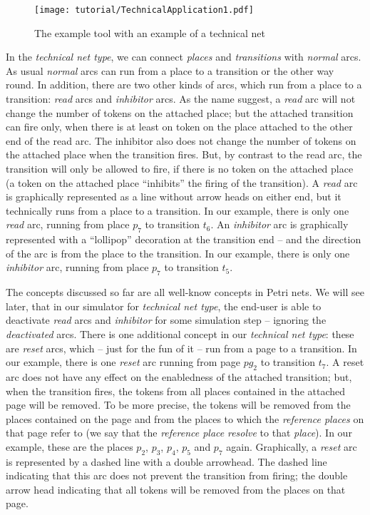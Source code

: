\begin{sidewaysfigure}[p!!]
  \centerline{\texttt{[image: tutorial/TechnicalApplication1.pdf]}}
  \caption{The example tool with an example of a technical net}
  \label{fig:tutorial:app1}
\end{sidewaysfigure}

In the \emph{technical net type}, we can connect \emph{places} and
\emph{transitions} with \emph{normal} arcs. As usual \emph{normal} arcs can run
from a place to a transition or the other way round. In addition, there are two
other kinds of arcs, which run from a place to a transition: \emph{read} arcs
and \emph{inhibitor} arcs. As the name suggest, a \emph{read} arc will not
change the number of tokens on the attached place; but the attached
transition can fire only, when there is at least on token on the place attached
to the other end of the read arc.
The inhibitor also does not change the number of tokens on the attached place when the transition fires. But, by contrast to the read
arc, the transition will only be allowed to fire, if there is no token on the
attached place (a token on the attached place ``inhibits'' the firing of the
transition). A \emph{read} arc is graphically represented as a line without
arrow heads on either end, but it technically runs from a place to a
transition. In our example, there is only one \emph{read} arc, running from
place $p_7$ to transition $t_6$.
An \emph{inhibitor} arc is graphically represented with a ``lollipop''
decoration at the transition end --  and the direction of the arc is from
the place to the transition. In our example, there is only one \emph{inhibitor}
arc, running from place $p_7$ to transition $t_5$.

The concepts discussed so far are all well-know concepts in Petri nets. We
will see later, that in our simulator for \emph{technical net type}, the
end-user is able to deactivate \emph{read} arcs and \emph{inhibitor} for some
simulation step -- ignoring the \emph{deactivated} arcs. There is one additional
concept in our \emph{technical net type}: these are \emph{reset} arcs, which --
just for the fun of it -- run from a page to a transition. In our example, there is one
\emph{reset} arc running from page $pg_2$ to transition $t_7$. A reset arc
does not have any effect on the enabledness of the attached transition; but,
when the transition fires, the tokens from all places contained in the attached
page will be removed. To be more precise, the tokens will be removed from the
places contained on the page and from the places to which the \emph{reference
places} on that page refer to (we say that the \emph{reference place}
\emph{resolve} to that \emph{place}).
In our example, these are the places $p_2$, $p_3$, $p_4$, $p_5$ and $p_7$ again. Graphically,
a \emph{reset} arc is represented by a dashed line with a double arrowhead.
The dashed line indicating that this arc does not prevent the transition from
firing; the double arrow head indicating that all tokens will be
removed from the places on that page.

